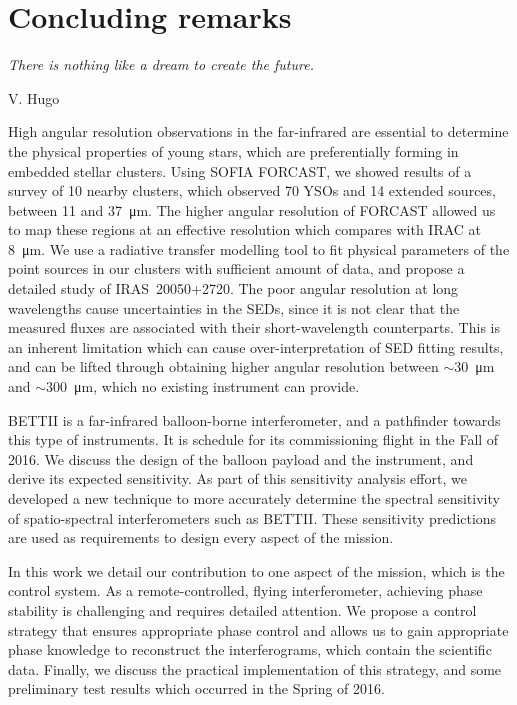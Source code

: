 
\chapter[Concluding remarks]{Concluding remarks} %
\label{chap:conclusion}


\epigraph{\small\itshape There is nothing like a dream to create the future.}{V. Hugo}

High angular resolution observations in the far-infrared are essential to determine the physical properties of young stars, which are preferentially forming in embedded stellar clusters. Using SOFIA FORCAST, we showed results of a survey of 10 nearby clusters, which observed 70 YSOs and 14 extended sources, between 11 and \SI{37}{\um}. The higher angular resolution of FORCAST allowed us to map these regions at an effective resolution which compares with \Spitzer IRAC at \SI{8}{\um}. We use a radiative transfer modelling tool to fit physical parameters of the point sources in our clusters with sufficient amount of data, and propose a detailed study of IRAS~20050+2720. The poor angular resolution at long wavelengths cause uncertainties in the SEDs, since it is not clear that the measured fluxes are associated with their short-wavelength counterparts. This is an inherent limitation which can cause over-interpretation of SED fitting results, and can be lifted through obtaining higher angular resolution between $\sim$\SI{30}{\um} and $\sim$\SI{300}{\um}, which no existing instrument can provide.


BETTII is a far-infrared balloon-borne interferometer, and a pathfinder towards this type of instruments. It is schedule for its commissioning flight in the Fall of 2016. We discuss the design of the balloon payload and the instrument, and derive its expected sensitivity. As part of this sensitivity analysis effort, we developed a new technique to more accurately determine the spectral sensitivity of spatio-spectral interferometers such as BETTII. These sensitivity predictions are used as requirements to design every aspect of the mission.

In this work we detail our contribution to one aspect of the mission, which is the control system. As a remote-controlled, flying interferometer, achieving phase stability is challenging and requires detailed attention. We propose a control strategy that ensures appropriate phase control and allows us to gain appropriate phase knowledge to reconstruct the interferograms, which contain the scientific data. Finally, we discuss the practical implementation of this strategy, and some preliminary test results which occurred in the Spring of 2016.

